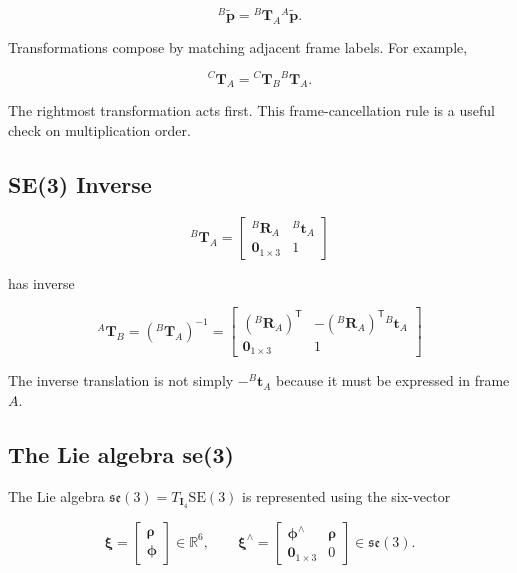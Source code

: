 \documentclass[10pt,a4paper]{article}
\numberwithin{equation}{section}
\newcommand{\Subsection}[1]{\subsection{#1}}
\newcommand{\SEthree}{\mathrm{SE}(3)}
\newcommand{\sethree}{\mathfrak{se}(3)}
\newcommand{\vect}[1]{\boldsymbol{#1}}
\theoremstyle{definition}
\theoremstyle{exercisestyle}
\begin{document}
\begin{equation}
    {}^B\widetilde{\mathbf{p}}
    ={}^B\mathbf{T}_A{}^A\widetilde{\mathbf{p}}.
\end{equation}

Transformations compose by matching adjacent frame labels. For example,

\begin{equation}
    {}^C\mathbf{T}_A
    ={}^C\mathbf{T}_B{}^B\mathbf{T}_A.
    \label{eq:transform-composition}
\end{equation}

The rightmost transformation acts first. This frame-cancellation rule is a
useful check on multiplication order.

\Subsection{SE(3) Inverse}

\begin{equation}
    {}^B\mathbf{T}_A = \begin{bmatrix}
        {}^B\mathbf{R}_A      & {}^B\mathbf{t}_A \\
        \mathbf{0}_{1\times3} & 1
    \end{bmatrix}
\end{equation}

has inverse

\begin{equation}
    {}^A\mathbf{T}_B
    =\left({}^B\mathbf{T}_A\right)^{-1}
    =\begin{bmatrix}
        ({}^B\mathbf{R}_A)^{\mathsf T}
                              & -({}^B\mathbf{R}_A)^{\mathsf T}{}^B\mathbf{t}_A \\
        \mathbf{0}_{1\times3} & 1
    \end{bmatrix}
    \label{eq:se3-inverse}
\end{equation}

The inverse translation is not simply $-{}^B\mathbf{t}_A$ because it must be
expressed in frame $A$.

\Subsection{The Lie algebra se(3)}

The Lie algebra $\sethree=T_{\mathbf{I}_4}\SEthree$ is represented using the
six-vector

\begin{equation}
    \vect{\xi}=\begin{bmatrix}
        \vect{\rho} \\
        \vect{\phi}
    \end{bmatrix}
    \in\mathbb{R}^6,
    \qquad
    \vect{\xi}^\wedge=
    \begin{bmatrix}
        \vect{\phi}^\wedge    & \vect{\rho} \\
        \mathbf{0}_{1\times3} & 0
    \end{bmatrix}
    \in\sethree.
    \label{eq:se3-hat}
\end{equation}
\end{document}
